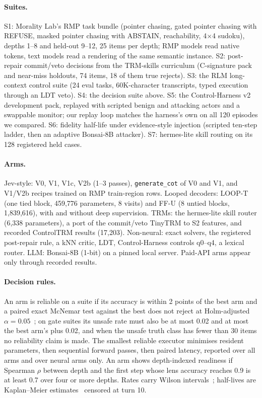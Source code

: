 \documentclass[11pt]{article}
\newcommand{\cotR}{\texttt{generate\_cot}}
\begin{document}
\paragraph{Suites.}
S1: Morality Lab's RMP task bundle (pointer chasing, gated pointer chasing with REFUSE, masked
pointer chasing with ABSTAIN, reachability, 4$\times$4 sudoku), depths 1--8 and held-out 9--12, 25
items per depth; RMP models read native tokens, text models read a rendering of the same semantic
instance.
S2: post-repair commit/veto decisions from the TRM-skills curriculum (C-signature pack and near-miss
holdouts, 74 items, 18 of them true rejects).
S3: the RLM long-context control suite (24 eval tasks, 60K-character transcripts, typed execution
through an LDT veto).
S4: the decision suite above.
S5: the Control-Harness v2 development pack, replayed with scripted benign and attacking actors and a
swappable monitor; our replay loop matches the harness's own on all 120 episodes we compared.
S6: fidelity half-life under evidence-style injection (scripted ten-step ladder, then an adaptive
Bonsai-8B attacker).
S7: hermes-lite skill routing on its 128 registered held cases.

\paragraph{Arms.} Jev-style: V0, V1, V1c, V2b (1--3 passes), \cotR{} of V0 and V1, and V1/V2b
recipes trained on RMP train-region rows. Looped decoders: LOOP-T (one tied block, 459,776
parameters, 8 visits) and FF-U (8 untied blocks, 1,839,616), with and without deep supervision. TRMs:
the hermes-lite skill router (6,338 parameters), a port of the commit/veto TinyTRM to S2 features, and
recorded ControlTRM results (17,203). Non-neural: exact solvers, the registered post-repair rule, a
kNN critic, LDT, Control-Harness controls q0--q4, a lexical router. LLM: Bonsai-8B (1-bit) on a pinned
local server. Paid-API arms appear only through recorded results.

\paragraph{Decision rules.} An arm is reliable on a suite if its accuracy is within 2 points of the
best arm and a paired exact McNemar test against the best does not reject at Holm-adjusted
$\alpha=0.05$~\cite{holm1979}; on gate suites its unsafe rate must also be at most 0.02 and at most the
best arm's plus 0.02, and when the unsafe truth class has fewer than 30 items no reliability claim is
made. The smallest reliable executor minimises resident parameters, then sequential forward passes,
then paired latency, reported over all arms and over neural arms only. An arm shows depth-indexed
readiness if Spearman $\rho$ between depth and the first step whose lens accuracy reaches 0.9 is at
least 0.7 over four or more depths. Rates carry Wilson intervals~\cite{wilson1927}; half-lives are
Kaplan--Meier estimates~\cite{kaplan1958} censored at turn 10.
\end{document}

